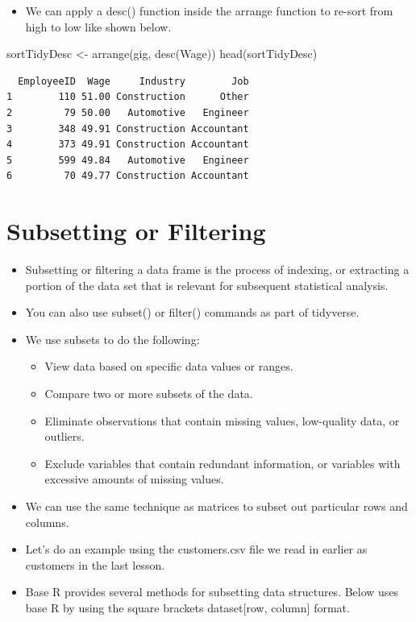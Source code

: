 \documentclass[
  letterpaper,
  DIV=11,
  numbers=noendperiod]{scrreprt}
\newenvironment{Shaded}{\begin{snugshade}}{\end{snugshade}}
\newcommand{\FunctionTok}[1]{\textcolor[rgb]{0.28,0.35,0.67}{#1}}
\newcommand{\NormalTok}[1]{\textcolor[rgb]{0.00,0.23,0.31}{#1}}
\newcommand{\OtherTok}[1]{\textcolor[rgb]{0.00,0.23,0.31}{#1}}
\providecommand{\tightlist}{%
  \setlength{\itemsep}{0pt}\setlength{\parskip}{0pt}}\usepackage{longtable,booktabs,array}
\begin{document}
\begin{itemize}
\tightlist
\item
  We can apply a desc() function inside the arrange function to re-sort
  from high to low like shown below.
\end{itemize}

\begin{Shaded}
\begin{Highlighting}[]
\NormalTok{sortTidyDesc }\OtherTok{\textless{}{-}} \FunctionTok{arrange}\NormalTok{(gig, }\FunctionTok{desc}\NormalTok{(Wage))}
\FunctionTok{head}\NormalTok{(sortTidyDesc)}
\end{Highlighting}
\end{Shaded}

\begin{verbatim}
  EmployeeID  Wage     Industry        Job
1        110 51.00 Construction      Other
2         79 50.00   Automotive   Engineer
3        348 49.91 Construction Accountant
4        373 49.91 Construction Accountant
5        599 49.84   Automotive   Engineer
6         70 49.77 Construction Accountant
\end{verbatim}


\chapter{Subsetting or Filtering}\label{subsetting-or-filtering}

\begin{itemize}
\item
  Subsetting or filtering a data frame is the process of indexing, or
  extracting a portion of the data set that is relevant for subsequent
  statistical analysis.
\item
  You can also use subset() or filter() commands as part of tidyverse.
\item
  We use subsets to do the following:

  \begin{itemize}
  \tightlist
  \item
    View data based on specific data values or ranges.
  \item
    Compare two or more subsets of the data.
  \item
    Eliminate observations that contain missing values, low-quality
    data, or outliers.
  \item
    Exclude variables that contain redundant information, or variables
    with excessive amounts of missing values.
  \end{itemize}
\item
  We can use the same technique as matrices to subset out particular
  rows and columns.
\item
  Let's do an example using the customers.csv file we read in earlier as
  customers in the last lesson.
\item
  Base R provides several methods for subsetting data structures. Below
  uses base R by using the square brackets dataset{[}row, column{]}
  format.
\end{itemize}
\end{document}
